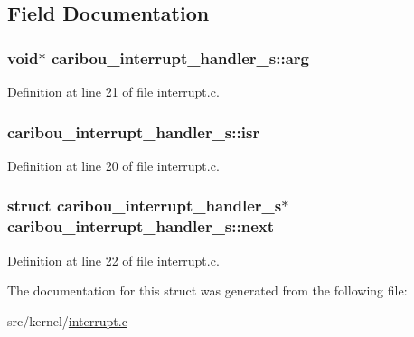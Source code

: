 \subsection{Field Documentation}
\hypertarget{structcaribou__interrupt__handler__s_aefaec04418af509f17589f6e3ed6ff0e}{
\subsubsection[{arg}]{\setlength{\rightskip}{0pt plus 5cm}void$\ast$ caribou\-\_\-interrupt\-\_\-handler\-\_\-s\-::arg}}\label{structcaribou__interrupt__handler__s_aefaec04418af509f17589f6e3ed6ff0e}


Definition at line 21 of file interrupt.\-c.

\hypertarget{structcaribou__interrupt__handler__s_aecb54a9629094e45d0de339021c6a1a0}{
\subsubsection[{isr}]{ caribou\-\_\-interrupt\-\_\-handler\-\_\-s\-::isr}}\label{structcaribou__interrupt__handler__s_aecb54a9629094e45d0de339021c6a1a0}


Definition at line 20 of file interrupt.\-c.

\hypertarget{structcaribou__interrupt__handler__s_a0d58e1ee1f99080457360177c803b034}{
\subsubsection[{next}]{\setlength{\rightskip}{0pt plus 5cm}struct {\bf caribou\-\_\-interrupt\-\_\-handler\-\_\-s}$\ast$ caribou\-\_\-interrupt\-\_\-handler\-\_\-s\-::next}}\label{structcaribou__interrupt__handler__s_a0d58e1ee1f99080457360177c803b034}


Definition at line 22 of file interrupt.\-c.



The documentation for this struct was generated from the following file\-:\begin{DoxyCompactItemize}
\item 
src/kernel/\hyperlink{interrupt_8c}{interrupt.\-c}\end{DoxyCompactItemize}
